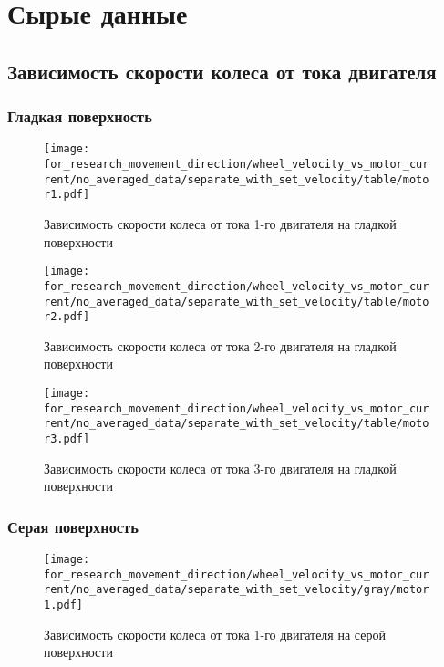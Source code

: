 \section{Сырые данные}

\subsection{Зависимость скорости колеса от тока двигателя}

\subsubsection{Гладкая поверхность}

\begin{figure}[H]
    \centering
    \texttt{[image: for\_research\_movement\_direction/wheel\_velocity\_vs\_motor\_current/no\_averaged\_data/separate\_with\_set\_velocity/table/motor1.pdf]}
    \caption{Зависимость скорости колеса от тока 1-го двигателя на гладкой поверхности}
\end{figure}

\begin{figure}[H]
    \centering
    \texttt{[image: for\_research\_movement\_direction/wheel\_velocity\_vs\_motor\_current/no\_averaged\_data/separate\_with\_set\_velocity/table/motor2.pdf]}
    \caption{Зависимость скорости колеса от тока 2-го двигателя на гладкой поверхности}
\end{figure}

\begin{figure}[H]
    \centering
    \texttt{[image: for\_research\_movement\_direction/wheel\_velocity\_vs\_motor\_current/no\_averaged\_data/separate\_with\_set\_velocity/table/motor3.pdf]}
    \caption{Зависимость скорости колеса от тока 3-го двигателя на гладкой поверхности}
\end{figure}

\subsubsection{Серая поверхность}

\begin{figure}[H]
    \centering
    \texttt{[image: for\_research\_movement\_direction/wheel\_velocity\_vs\_motor\_current/no\_averaged\_data/separate\_with\_set\_velocity/gray/motor1.pdf]}
    \caption{Зависимость скорости колеса от тока 1-го двигателя на серой поверхности}
\end{figure}

